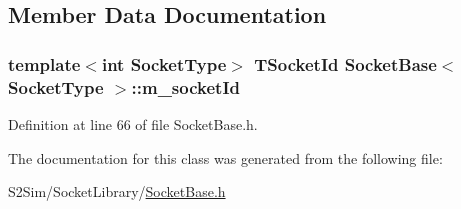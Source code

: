 \subsection{Member Data Documentation}
\hypertarget{class_socket_base_aa9d855a8843ac61555721dfbedbad5a8}{
\subsubsection[{m\-\_\-socket\-Id}]{\setlength{\rightskip}{0pt plus 5cm}template$<$int Socket\-Type$>$ {\bf T\-Socket\-Id} {\bf Socket\-Base}$<$ Socket\-Type $>$\-::m\-\_\-socket\-Id\hspace{0.3cm}{\ttfamily [protected]}}}\label{class_socket_base_aa9d855a8843ac61555721dfbedbad5a8}


Definition at line 66 of file Socket\-Base.\-h.



The documentation for this class was generated from the following file\-:\begin{DoxyCompactItemize}
\item 
S2\-Sim/\-Socket\-Library/\hyperlink{_socket_base_8h}{Socket\-Base.\-h}\end{DoxyCompactItemize}
